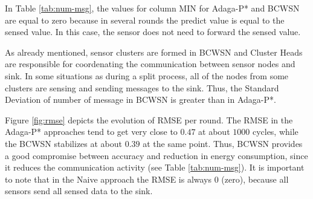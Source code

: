 \documentclass{acm_proc_article-sp}
\begin{document}
In Table \ref{tab:num-msg}, the values for column MIN for Adaga-P* and BCWSN are
equal to zero because in several rounds the predict value is equal to the sensed
value. In this case, the sensor does not need to forward the sensed value. 

As already mentioned, sensor clusters are formed in BCWSN and Cluster Heads are
responsible for coordenating the communication between sensor nodes and sink.
In some situations as during a split process, all of the nodes from some
clusters are sensing and sending messages to the sink. Thus, the Standard
Deviation of number of message in BCWSN is greater than in Adaga-P*.




Figure \ref{fig:rmse} depicts the evolution of RMSE per round. The RMSE in the
Adaga-P* approaches tend to get very close to $0.47$ at about $1000$ cycles,
while the BCWSN stabilizes at about $0.39$ at the same point. Thus, BCWSN
provides a good compromise between accuracy and reduction in energy consumption,
since it reduces the communication activity (see Table \ref{tab:num-msg}). It is
important to note that in the Naive approach the RMSE is always 0 (zero),
because all sensors send all sensed data to the sink.
\end{document}
